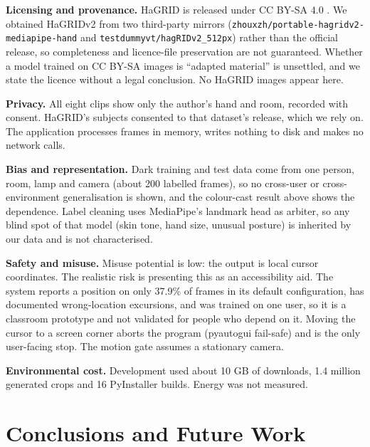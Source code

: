 \documentclass[conference,a4paper]{IEEEtran}
\begin{document}
\textbf{Licensing and provenance.} HaGRID is released under CC BY-SA 4.0
\cite{hagrid}. We obtained HaGRIDv2 from two third-party mirrors
(\texttt{zhouxzh/portable-hagridv2-mediapipe-hand} and
\texttt{testdummyvt/hagRIDv2\_512px}) rather than the official release, so
completeness and licence-file preservation are not guaranteed. Whether a
model trained on CC BY-SA images is ``adapted material'' is unsettled, and
we state the licence without a legal conclusion. No HaGRID images appear
here.

\textbf{Privacy.} All eight clips show only the author's hand and room,
recorded with consent. HaGRID's subjects consented to that dataset's
release, which we rely on. The application processes frames in memory,
writes nothing to disk and makes no network calls.

\textbf{Bias and representation.} Dark training and test data come from one
person, room, lamp and camera (about 200 labelled frames), so no cross-user
or cross-environment generalisation is shown, and the colour-cast result
above shows the dependence. Label cleaning uses MediaPipe's landmark head
as arbiter, so any blind spot of that model (skin tone, hand size, unusual
posture) is inherited by our data and is not characterised.

\textbf{Safety and misuse.} Misuse potential is low: the output is local
cursor coordinates. The realistic risk is presenting this as an
accessibility aid. The system reports a position on only 37.9\% of frames
in its default configuration, has documented wrong-location excursions, and
was trained on one user, so it is a classroom prototype and not validated
for people who depend on it. Moving the cursor to a screen corner aborts
the program (pyautogui fail-safe) and is the only user-facing stop. The
motion gate assumes a stationary camera.

\textbf{Environmental cost.} Development used about 10 GB of downloads, 1.4
million generated crops and 16 PyInstaller builds. Energy was not measured.

\section{Conclusions and Future Work}
\end{document}
